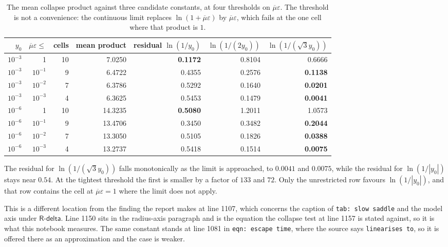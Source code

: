 \documentclass[11pt,a4paper]{article}
\providecommand{\abs}[1]{\left \vert #1 \right \vert}
\providecommand{\Rdelta}{\textsf{R-delta}}
\theoremstyle{definition}
\theoremstyle{remark}
\begin{document}
\begin{table}[H]
  \centering\small
  \caption{The mean collapse product against three candidate constants, at four
    thresholds on $\overline{\mu}\varepsilon$. The threshold is not a
    convenience: the continuous limit replaces
    $\ln(1+\overline{\mu}\varepsilon)$ by $\overline{\mu}\varepsilon$, which
    fails at the one cell where that product is $1$.}
  \label{tab: collapse}
  \begin{tabular}{rrrrrrr}
    \toprule
    $y_0$ & $\overline{\mu}\varepsilon \leq$ & cells & mean product
      & residual $\ln(1/y_0)$ & $\ln(1/(2y_0))$ & $\ln(1/(\sqrt3 y_0))$ \\
    \midrule
    $10^{-3}$ & 1         & 10 &  7.0250 & \textbf{0.1172} & 0.8104 & 0.6666 \\
    $10^{-3}$ & $10^{-1}$ &  9 &  6.4722 & 0.4355 & 0.2576 & \textbf{0.1138} \\
    $10^{-3}$ & $10^{-2}$ &  7 &  6.3786 & 0.5292 & 0.1640 & \textbf{0.0201} \\
    $10^{-3}$ & $10^{-3}$ &  4 &  6.3625 & 0.5453 & 0.1479 & \textbf{0.0041} \\
    \midrule
    $10^{-6}$ & 1         & 10 & 14.3235 & \textbf{0.5080} & 1.2011 & 1.0573 \\
    $10^{-6}$ & $10^{-1}$ &  9 & 13.4706 & 0.3450 & 0.3482 & \textbf{0.2044} \\
    $10^{-6}$ & $10^{-2}$ &  7 & 13.3050 & 0.5105 & 0.1826 & \textbf{0.0388} \\
    $10^{-6}$ & $10^{-3}$ &  4 & 13.2737 & 0.5418 & 0.1514 & \textbf{0.0075} \\
    \bottomrule
  \end{tabular}
\end{table}

The residual for $\ln(1/(\sqrt3 y_0))$ falls monotonically as the limit is
approached, to $0.0041$ and $0.0075$, while the residual for $\ln(1/\abs{y_0})$
stays near $0.54$. At the tightest threshold the first is smaller by a factor of
$133$ and $72$. Only the unrestricted row favours $\ln(1/\abs{y_0})$, and that
row contains the cell at $\overline{\mu}\varepsilon = 1$ where the limit does not
apply.

This is a different location from the finding the report makes at line 1107,
which concerns the caption of \texttt{tab: slow saddle} and the model axis under
$\Rdelta$. Line 1150 sits in the radius-axis paragraph and is the equation the
collapse test at line 1157 is stated against, so it is what this notebook
measures. The same constant stands at line 1081 in \texttt{eqn: escape time},
where the source says \texttt{linearises to}, so it is offered there as an
approximation and the case is weaker.
\end{document}
